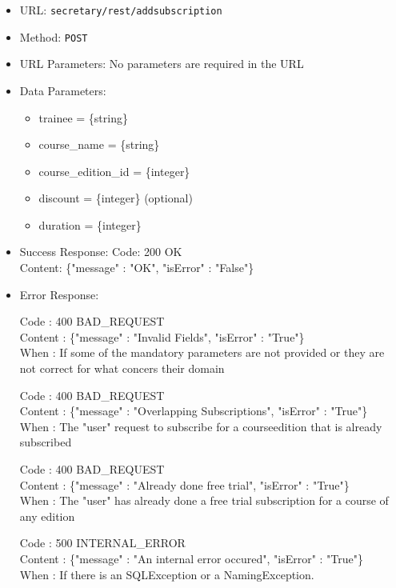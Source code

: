 \begin{itemize}
    \item URL: \texttt{secretary/rest/addsubscription}
    \item Method: \texttt{POST}
    \item URL Parameters: No parameters are required in the URL
    \item Data Parameters: 
    \begin{itemize}
    	\item trainee = \{string\}
     	\item course\_name = \{string\}
     	\item course\_edition\_id = \{integer\}
     	\item discount = \{integer\} (optional)
     	\item duration = \{integer\}
    \end{itemize}
    \item Success Response:
    Code: 200 OK\\
    Content:  \{"message" : "OK", "isError" : "False"\}
    \item Error Response:
	
	Code : 400 BAD\_REQUEST\\
	Content : \{"message" : "Invalid Fields", "isError" : "True"\}\\
	When : If some of the mandatory parameters are not provided or they are not correct for what concers their domain
	
	Code : 400 BAD\_REQUEST\\
	Content : \{"message" : "Overlapping Subscriptions", "isError" : "True"\}\\
    When : The "user" request to subscribe for a courseedition that is already subscribed
	
	Code : 400 BAD\_REQUEST\\
	Content : \{"message" : "Already done free trial", "isError" : "True"\}\\
	When : The "user" has already done a free trial subscription for a course of any edition
	    
    Code : 500 INTERNAL\_ERROR\\
    Content : \{"message" : "An internal error occured", "isError" : "True"\}\\
    When : If there is an SQLException or a NamingException.
    
    
\end{itemize}

